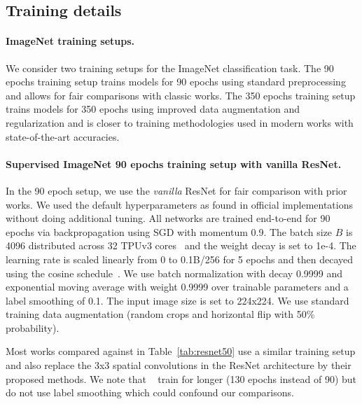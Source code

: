 \documentclass{article} \usepackage{iclr2021_conference,times}
\begin{document}
\subsection{Training details\label{sec:training_details}}

\vspace{-0.1cm}
\paragraph{ImageNet training setups.}
We consider two training setups for the ImageNet classification task.
The 90 epochs training setup trains models for 90 epochs using standard preprocessing and allows for fair comparisons with classic works.
The 350 epochs training setup trains models for 350 epochs using improved data augmentation and regularization
and is closer to training methodologies used in modern works with state-of-the-art accuracies.

\vspace{-0.1cm}
\paragraph{Supervised ImageNet 90 epochs training setup with vanilla ResNet.}
In the 90 epoch setup, we use the \emph{vanilla} ResNet for fair comparison with prior works.
We used the default hyperparameters as found in official implementations without doing additional tuning.
All networks are trained end-to-end for 90 epochs via backpropagation using SGD with momentum 0.9.
The batch size $B$ is 4096 distributed across 32 TPUv3 cores~\citep{jouppiTPU} and the weight decay is set to 1e-4.
The learning rate is scaled linearly from 0 to 0.1B/256 for 5 epochs and then decayed using the cosine schedule~\citep{loshchilov2016sgdr}.
We use batch normalization with decay 0.9999 and exponential moving average with weight 0.9999 over trainable parameters and a label smoothing of 0.1.
The input image size is set to 224x224.
We use standard training data augmentation (random crops and horizontal flip with 50\% probability).

Most works compared against in Table~\ref{tab:resnet50} use a similar training setup and also replace the 3x3 spatial convolutions in the ResNet architecture by their proposed methods.
We note that ~\cite{ramachandran2019sasa} train for longer (130 epochs instead of 90) but do not use label smoothing which could confound our comparisons.

\vspace{-0.1cm}
\end{document}
